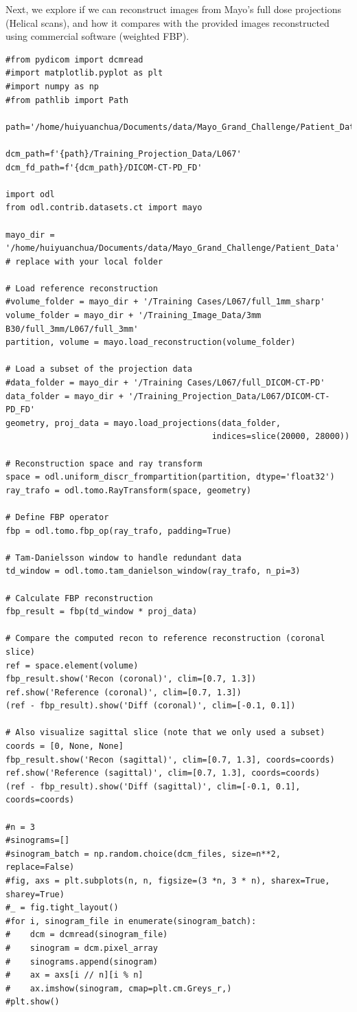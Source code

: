 \documentclass[a4paper, 11pt]{article}
\begin{document}
Next, we explore if we can reconstruct images from Mayo's full dose projections (Helical scans), and how it compares with the provided images reconstructed using commercial software (weighted FBP).
\begin{verbatim}
#from pydicom import dcmread
#import matplotlib.pyplot as plt
#import numpy as np
#from pathlib import Path

path='/home/huiyuanchua/Documents/data/Mayo_Grand_Challenge/Patient_Data'

dcm_path=f'{path}/Training_Projection_Data/L067'
dcm_fd_path=f'{dcm_path}/DICOM-CT-PD_FD'

import odl
from odl.contrib.datasets.ct import mayo

mayo_dir = '/home/huiyuanchua/Documents/data/Mayo_Grand_Challenge/Patient_Data'  # replace with your local folder

# Load reference reconstruction
#volume_folder = mayo_dir + '/Training Cases/L067/full_1mm_sharp'
volume_folder = mayo_dir + '/Training_Image_Data/3mm B30/full_3mm/L067/full_3mm'
partition, volume = mayo.load_reconstruction(volume_folder)

# Load a subset of the projection data
#data_folder = mayo_dir + '/Training Cases/L067/full_DICOM-CT-PD'
data_folder = mayo_dir + '/Training_Projection_Data/L067/DICOM-CT-PD_FD'
geometry, proj_data = mayo.load_projections(data_folder,
                                          indices=slice(20000, 28000))

# Reconstruction space and ray transform
space = odl.uniform_discr_frompartition(partition, dtype='float32')
ray_trafo = odl.tomo.RayTransform(space, geometry)

# Define FBP operator
fbp = odl.tomo.fbp_op(ray_trafo, padding=True)

# Tam-Danielsson window to handle redundant data
td_window = odl.tomo.tam_danielson_window(ray_trafo, n_pi=3)

# Calculate FBP reconstruction
fbp_result = fbp(td_window * proj_data)

# Compare the computed recon to reference reconstruction (coronal slice)
ref = space.element(volume)
fbp_result.show('Recon (coronal)', clim=[0.7, 1.3])
ref.show('Reference (coronal)', clim=[0.7, 1.3])
(ref - fbp_result).show('Diff (coronal)', clim=[-0.1, 0.1])

# Also visualize sagittal slice (note that we only used a subset)
coords = [0, None, None]
fbp_result.show('Recon (sagittal)', clim=[0.7, 1.3], coords=coords)
ref.show('Reference (sagittal)', clim=[0.7, 1.3], coords=coords)
(ref - fbp_result).show('Diff (sagittal)', clim=[-0.1, 0.1], coords=coords)

#n = 3
#sinograms=[]
#sinogram_batch = np.random.choice(dcm_files, size=n**2, replace=False)
#fig, axs = plt.subplots(n, n, figsize=(3 *n, 3 * n), sharex=True, sharey=True)
#_ = fig.tight_layout()
#for i, sinogram_file in enumerate(sinogram_batch):
#    dcm = dcmread(sinogram_file)
#    sinogram = dcm.pixel_array
#    sinograms.append(sinogram)
#    ax = axs[i // n][i % n]
#    ax.imshow(sinogram, cmap=plt.cm.Greys_r,)
#plt.show()
\end{verbatim}
\end{document}
